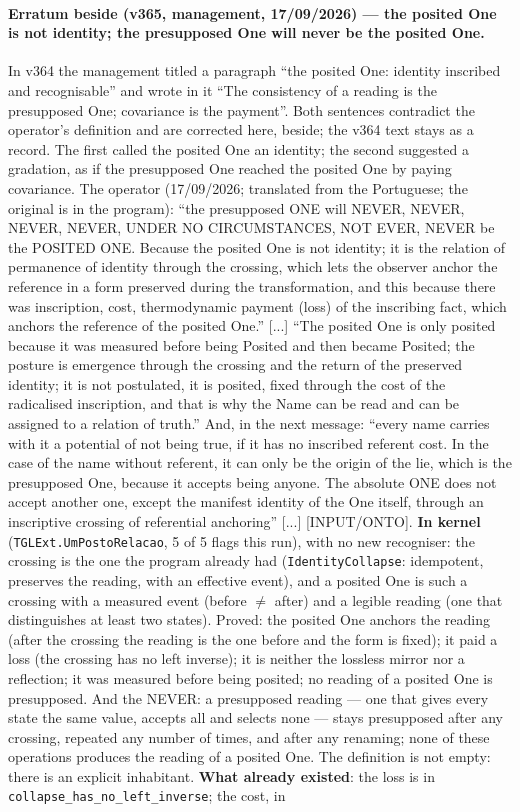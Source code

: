 \documentclass[11pt]{article}
\theoremstyle{definition}\newtheorem{deriv}{Derivation}
\begin{document}
\paragraph*{Erratum beside (v365, management, 17/09/2026) --- the posited One is not identity; the presupposed One will never be the posited One.} In v364 the management titled a paragraph ``the posited One: identity inscribed and recognisable'' and wrote in it ``The consistency of a reading is the presupposed One; covariance is the payment''. Both sentences contradict the operator's definition and are corrected here, beside; the v364 text stays as a record. The first called the posited One an identity; the second suggested a gradation, as if the presupposed One reached the posited One by paying covariance. The operator (17/09/2026; translated from the Portuguese; the original is in the program): ``the presupposed ONE will NEVER, NEVER, NEVER, NEVER, UNDER NO CIRCUMSTANCES, NOT EVER, NEVER be the POSITED ONE. Because the posited One is not identity; it is the relation of permanence of identity through the crossing, which lets the observer anchor the reference in a form preserved during the transformation, and this because there was inscription, cost, thermodynamic payment (loss) of the inscribing fact, which anchors the reference of the posited One.'' [...] ``The posited One is only posited because it was measured before being Posited and then became Posited; the posture is emergence through the crossing and the return of the preserved identity; it is not postulated, it is posited, fixed through the cost of the radicalised inscription, and that is why the Name can be read and can be assigned to a relation of truth.'' And, in the next message: ``every name carries with it a potential of not being true, if it has no inscribed referent cost. In the case of the name without referent, it can only be the origin of the lie, which is the presupposed One, because it accepts being anyone. The absolute ONE does not accept another one, except the manifest identity of the One itself, through an inscriptive crossing of referential anchoring'' [...] [INPUT/ONTO]. \textbf{In kernel} (\texttt{TGLExt.UmPostoRelacao}, 5 of 5 flags this run), with no new recogniser: the crossing is the one the program already had (\texttt{IdentityCollapse}: idempotent, preserves the reading, with an effective event), and a posited One is such a crossing with a measured event (before $\neq$ after) and a legible reading (one that distinguishes at least two states). Proved: the posited One anchors the reading (after the crossing the reading is the one before and the form is fixed); it paid a loss (the crossing has no left inverse); it is neither the lossless mirror nor a reflection; it was measured before being posited; no reading of a posited One is presupposed. And the NEVER: a presupposed reading --- one that gives every state the same value, accepts all and selects none --- stays presupposed after any crossing, repeated any number of times, and after any renaming; none of these operations produces the reading of a posited One. The definition is not empty: there is an explicit inhabitant. \textbf{What already existed}: the loss is in \texttt{collapse\_has\_no\_left\_inverse}; the cost, in 
\end{document}
